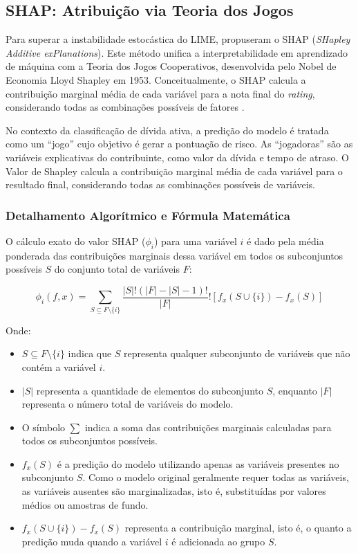 

\subsection{SHAP: Atribuição via Teoria dos Jogos}
\label{subsec:shap}

Para superar a instabilidade estocástica do LIME,  propuseram o SHAP (\textit{SHapley Additive exPlanations}). Este método unifica a interpretabilidade em aprendizado de máquina com a Teoria dos Jogos Cooperativos, desenvolvida pelo Nobel de Economia Lloyd Shapley em 1953. Conceitualmente, o SHAP calcula a contribuição marginal média de cada variável para a nota final do \textit{rating}, considerando todas as combinações possíveis de fatores \cite{nallakaruppanCreditRiskAssessment2024}.

No contexto da classificação de dívida ativa, a predição do modelo é tratada como um ``jogo'' cujo objetivo é gerar a pontuação de risco. As ``jogadoras'' são as variáveis explicativas do contribuinte, como valor da dívida e tempo de atraso. O Valor de Shapley calcula a contribuição marginal média de cada variável para o resultado final, considerando todas as combinações possíveis de variáveis.

\subsubsection{Detalhamento Algorítmico e Fórmula Matemática}

O cálculo exato do valor SHAP ($\phi_i$) para uma variável $i$ é dado pela média ponderada das contribuições marginais dessa variável em todos os subconjuntos possíveis $S$ do conjunto total de variáveis $F$:

\begin{equation}
    \phi_i(f, x) = \sum_{S \subseteq F \setminus \{i\}} \frac{|S|! (|F| - |S| - 1)!}{|F|}! [f_x(S \cup \{i\}) - f_x(S)]
\end{equation}

Onde:
\begin{itemize}
    \item $S \subseteq F \setminus \{i\}$ indica que $S$ representa qualquer subconjunto de variáveis que não contém a variável $i$.
    \item $|S|$ representa a quantidade de elementos do subconjunto $S$, enquanto $|F|$ representa o número total de variáveis do modelo.
    \item O símbolo $\sum$ indica a soma das contribuições marginais calculadas para todos os subconjuntos possíveis.
    \item $f_x(S)$ é a predição do modelo utilizando apenas as variáveis presentes no subconjunto $S$. Como o modelo original geralmente requer todas as variáveis, as variáveis ausentes são marginalizadas, isto é, substituídas por valores médios ou amostras de fundo.
    \item $f_x(S \cup \{i\}) - f_x(S)$ representa a contribuição marginal, isto é, o quanto a predição muda quando a variável $i$ é adicionada ao grupo $S$.
\end{itemize}

